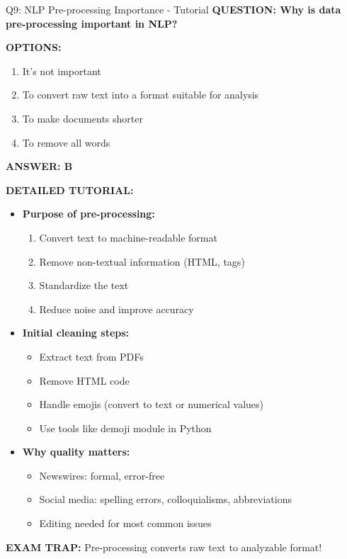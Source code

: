 \documentclass[8pt]{beamer}
\begin{document}
	\begin{frame}{Q9: NLP Pre-processing Importance - Tutorial}
		\fontsize{6.5}{7.5}\selectfont
		\textbf{QUESTION: Why is data pre-processing important in NLP?}
		
		\vspace{0.1cm}
		\textbf{OPTIONS:}
		\begin{enumerate}
			\item It's not important
			\item To convert raw text into a format suitable for analysis
			\item To make documents shorter
			\item To remove all words
		\end{enumerate}
		
		\vspace{0.1cm}
		\textcolor{myblue}{\textbf{ANSWER: B}}
		
		\vspace{0.1cm}
		\textbf{DETAILED TUTORIAL:}
		\begin{itemize}
			\item \textbf{Purpose of pre-processing:}
			\begin{enumerate}
				\item Convert text to machine-readable format
				\item Remove non-textual information (HTML, tags)
				\item Standardize the text
				\item Reduce noise and improve accuracy
			\end{enumerate}
			\item \textbf{Initial cleaning steps:}
			\begin{itemize}
				\item Extract text from PDFs
				\item Remove HTML code
				\item Handle emojis (convert to text or numerical values)
				\item Use tools like demoji module in Python
			\end{itemize}
			\item \textbf{Why quality matters:}
			\begin{itemize}
				\item Newswires: formal, error-free
				\item Social media: spelling errors, colloquialisms, abbreviations
				\item Editing needed for most common issues
			\end{itemize}
		\end{itemize}
		
		\textcolor{myred}{\textbf{EXAM TRAP:}} Pre-processing converts \textcolor{myblue}{raw text to analyzable format}!
	\end{frame}
	
\end{document}
